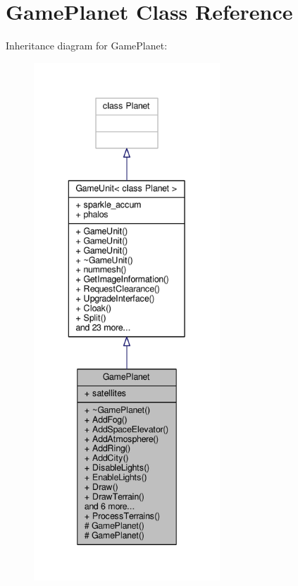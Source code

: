 \hypertarget{classGamePlanet}{}\section{Game\+Planet Class Reference}
\label{classGamePlanet}


Inheritance diagram for Game\+Planet\+:
\nopagebreak
\begin{figure}[H]
\begin{center}
\leavevmode
\includegraphics[height=550pt]{d7/d17/classGamePlanet__inherit__graph}
\end{center}
\end{figure}


